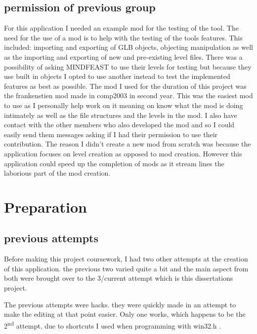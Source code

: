 \subsection{permission of previous group}
For this application I needed an example mod for the testing of the tool. The need for the use of a mod is to help with the testing of the tools features. This included: importing and exporting of GLB objects, objecting manipulation as well as the importing and exporting of new and pre-existing level files.
There was a possibility of asking MINDFEAST to use their levels for testing but because they use built in objects I opted to use another instead to test the implemented features as best as possible. 
The mod I used for the duration of this project was the frankenstien mod made in comp2003 in second year. This was the easiest mod to use as I personally help work on it meaning on know what the mod is doing intimately as well as the file structures and the levels in the mod. I also have contact with the other members  who also developed the mod and so I could easily send them messages asking if I had their permission to use their contribution. 
The reason I didn't create a new mod from scratch was because the application focuses on level creation as opposed to mod creation. However this application could speed up the completion of mods as it stream lines the laborious part of the mod creation.


\section{Preparation}
\subsection{previous attempts}
Before making this project coursework, I had two other attempts at the creation of this application. the previous two varied quite a bit and the main aspect from both were brought over to the 3/current attempt which is this dissertations project.

The previous attempts were hacks. they were quickly made in an attempt to make the editing at that point easier. Only one works, which happens to be the 2\textsuperscript{nd} attempt, due to shortcuts I used when programming with win32.h .
